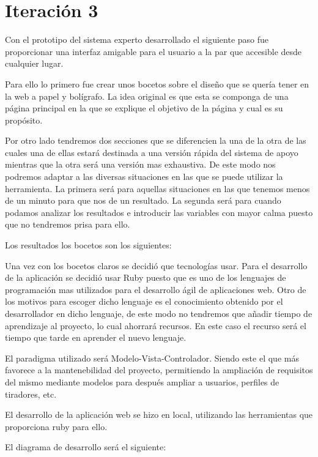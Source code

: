 \section{Iteración 3}


Con el prototipo del sistema experto desarrollado el siguiente paso fue
proporcionar una interfaz amigable para el usuario a la par que accesible
desde cualquier lugar.

Para ello lo primero fue crear unos bocetos sobre el diseño que se quería tener
en la web a papel y bolígrafo. La idea original es que esta se componga de una página
principal en la que se explique el objetivo de la página y cual es su propósito.

Por otro lado tendremos dos secciones que se diferencien la una de la otra de las
cuales una de ellas estará destinada a una versión rápida del sistema de apoyo mientras
que la otra será una versión mas exhaustiva. De este modo nos podremos adaptar
a las diversas situaciones en las que se puede utilizar la herramienta.
La primera será para aquellas situaciones en las que tenemos menos de un minuto
para que nos de un resultado. La segunda será para cuando podamos analizar
los resultados e introducir las variables con mayor calma puesto que no
tendremos prisa para ello.

Los resultados los bocetos son los siguientes:


Una vez con los bocetos claros se decidió que tecnologías usar. Para el desarrollo
de la aplicación se decidió usar Ruby puesto que es uno de los lenguajes
de programación mas utilizados para el desarrollo ágil de aplicaciones web.
Otro de los motivos para escoger dicho lenguaje es el conocimiento obtenido
por el desarrollador en dicho lenguaje, de este modo no tendremos que añadir
tiempo de aprendizaje al proyecto, lo cual ahorrará recursos. En este caso el
recurso será el tiempo que tarde en aprender el nuevo lenguaje.

El paradigma utilizado será Modelo-Vista-Controlador. Siendo este el que más
favorece a la mantenebilidad del proyecto, permitiendo la ampliación de requisitos
del mismo mediante modelos para después ampliar a usuarios, perfiles de tiradores,
etc.

El desarrollo de la aplicación web se hizo en local, utilizando las herramientas
que proporciona ruby para ello.

El diagrama de desarrollo será el siguiente:

